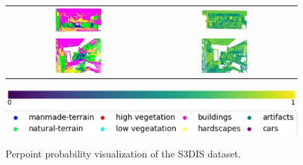 \begin{figure}[h!]
\begin{tabular}{cc}
            \includegraphics[width=0.33\textwidth, height=0.18\textheight]{images/seg_output/s3dis_DE/S3DIS_3_Pred.pdf}& 
            \includegraphics[width=0.33\textwidth, height=0.18\textheight]{images/seg_output/s3dis_DE/S3DIS_3_prob.pdf}\\

            \includegraphics[width=0.33\textwidth, height=0.18\textheight]{images/seg_output/s3dis_DE/S3DIS_4_Pred.pdf}& 
            \includegraphics[width=0.33\textwidth, height=0.18\textheight]{images/seg_output/s3dis_DE/S3DIS_4_prob.pdf}\\
        \end{tabular}
        \includegraphics[scale=0.45]{images/prob_legend.pdf}
        \includegraphics[scale=0.65]{images/legend.png}
        \caption{Perpoint probability visualization of the S3DIS dataset.}
        \label{fig:de_s3dis_probmap}
    \end{figure}

